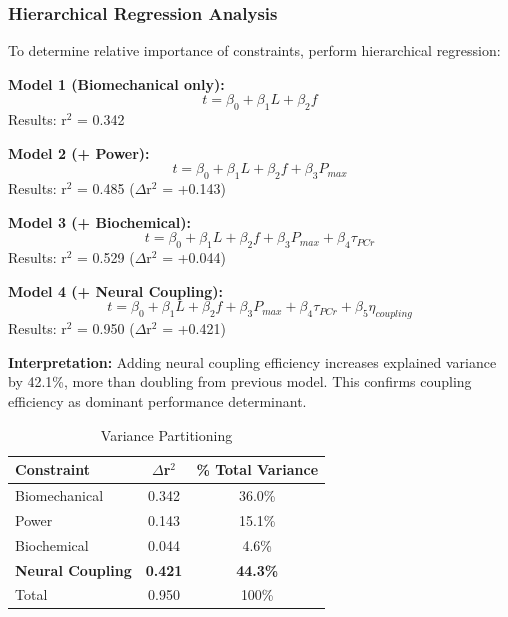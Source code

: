 \documentclass[10pt]{article}
\begin{document}
\subsubsection{Hierarchical Regression Analysis}

To determine relative importance of constraints, perform hierarchical regression:

\textbf{Model 1 (Biomechanical only):}
\begin{equation}
t = \beta_0 + \beta_1 L + \beta_2 f
\end{equation}
Results: r$^2$ = 0.342

\textbf{Model 2 (+ Power):}
\begin{equation}
t = \beta_0 + \beta_1 L + \beta_2 f + \beta_3 P_{max}
\end{equation}
Results: r$^2$ = 0.485 ($\Delta$r$^2$ = +0.143)

\textbf{Model 3 (+ Biochemical):}
\begin{equation}
t = \beta_0 + \beta_1 L + \beta_2 f + \beta_3 P_{max} + \beta_4 \tau_{PCr}
\end{equation}
Results: r$^2$ = 0.529 ($\Delta$r$^2$ = +0.044)

\textbf{Model 4 (+ Neural Coupling):}
\begin{equation}
t = \beta_0 + \beta_1 L + \beta_2 f + \beta_3 P_{max} + \beta_4 \tau_{PCr} + \beta_5 \eta_{coupling}
\end{equation}
Results: r$^2$ = 0.950 ($\Delta$r$^2$ = +0.421)

\textbf{Interpretation:} Adding neural coupling efficiency increases explained variance by 42.1\%, more than doubling from previous model. This confirms coupling efficiency as dominant performance determinant.

\begin{table}[H]
\centering
\caption{Variance Partitioning}
\begin{tabular}{lcc}
\toprule
Constraint & $\Delta$r$^2$ & \% Total Variance \\
\midrule
Biomechanical & 0.342 & 36.0\% \\
Power & 0.143 & 15.1\% \\
Biochemical & 0.044 & 4.6\% \\
\textbf{Neural Coupling} & \textbf{0.421} & \textbf{44.3\%} \\
\midrule
Total & 0.950 & 100\% \\
\bottomrule
\end{tabular}
\end{table}
\end{document}
